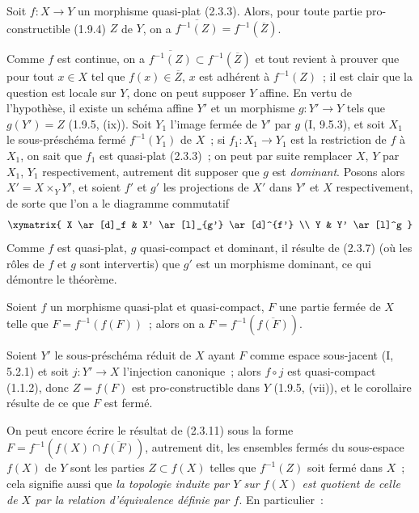 \begin{theorem}[2.3.10]
\label{IV.2.3.10-fr}
Soit $f:X\to Y$ un morphisme quasi-plat (2.3.3). Alors, pour toute partie
pro-constructible (1.9.4) $Z$ de $Y$, on a
$\overline{f^{-1}(Z)}=f^{-1}(\overline Z)$.
\end{theorem}

Comme $f$ est continue, on a
$\overline{f^{-1}(Z)}\subset f^{-1}(\overline Z)$ et tout revient à prouver
que pour tout $x\in X$ tel que $f(x)\in\overline Z$, $x$ est adhérent à
$f^{-1}(Z)$~; il est clair que la question est locale sur $Y$, donc on peut
supposer $Y$ affine. En vertu de l'hypothèse, il existe un schéma affine $Y'$
et un morphisme $g:Y'\to Y$ tels que $g(Y')=Z$ (1.9.5, (ix)). Soit $Y_1$
l'image fermée de $Y'$ par $g$ (I, 9.5.3), et soit $X_1$ le sous-préschéma
fermé $f^{-1}(Y_1)$ de $X$~; si $f_1:X_1\to Y_1$ est la restriction de $f$ à
$X_1$, on sait que $f_1$ est quasi-plat (2.3.3)~; on peut par suite remplacer
$X$, $Y$ par $X_1$, $Y_1$ respectivement, autrement dit supposer que $g$ est
\emph{dominant}. Posons alors $X'=X\times_Y Y'$, et soient $f'$ et $g'$ les
projections de $X'$ dans $Y'$ et $X$ respectivement, de sorte que l'on a le
diagramme commutatif
\[
\xymatrix{
  X \ar[d]_f & X' \ar[l]_{g'} \ar[d]^{f'} \\
  Y & Y' \ar[l]^g
}
\]
Comme $f$ est quasi-plat, $g$ quasi-compact et dominant, il résulte de (2.3.7)
(où les rôles de $f$ et $g$ sont intervertis) que $g'$ est un morphisme
dominant, ce qui démontre le théorème.

\begin{corollary}[2.3.11]
\label{IV.2.3.11-fr}
Soient $f$ un morphisme quasi-plat et quasi-compact, $F$ une partie fermée de
$X$ telle que $F=f^{-1}(f(F))$~; alors on a
$F=f^{-1}(\overline{f(F)})$.
\end{corollary}

Soient $Y'$ le sous-préschéma réduit de $X$ ayant $F$ comme espace sous-jacent
(I, 5.2.1) et soit $j:Y'\to X$ l'injection canonique~; alors $f\circ j$ est
quasi-compact (1.1.2),
donc $Z=f(F)$ est pro-constructible dans $Y$ (1.9.5, (vii)), et le corollaire
résulte de ce que $F$ est fermé.

On peut encore écrire le résultat de (2.3.11) sous la forme
$F=f^{-1}(f(X)\cap\overline{f(F)})$, autrement dit, les ensembles fermés du
sous-espace $f(X)$ de $Y$ sont les parties $Z\subset f(X)$ telles que
$f^{-1}(Z)$ soit fermé dans $X$~; cela signifie aussi que \emph{la topologie
induite par $Y$ sur $f(X)$ est quotient de celle de $X$ par la relation
d'équivalence définie par $f$}. En particulier~:

